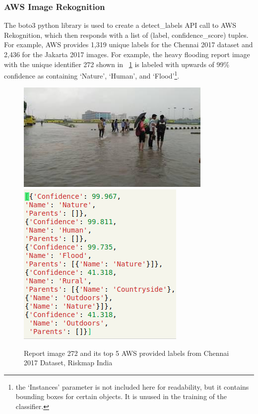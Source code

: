 \subsubsection{AWS Image Rekognition}\label{chap4:aws}
The boto3 python library is used to create a detect\_labels API call 
to AWS Rekognition, which then responds with a list of (label,
confidence\_score) tuples. For example, AWS provides 1,319 unique labels for the
Chennai 2017 dataset and 2,436 for the Jakarta 2017 images. For example, the
heavy flooding report image with the unique identifier 272 shown in
\figureautorefname{}~\ref{fig:aws_272} is labeled with upwards of 99\% confidence as containing `Nature', `Human', and `Flood'\footnote{the `Instances' parameter is
not included here for readability, but it contains bounding boxes for certain
objects. It is unused in the training of the classifier.}.
\begin{figure}[ht]
    \centering
    \captionsetup{justification=centering}
    \includegraphics[scale=0.6]{images/ch/272.jpeg}
    \includegraphics[scale=0.6]{images/ch/aws_272.png}
    \caption{Report image 272 and its top 5 AWS provided labels from Chennai
    2017 Dataset, Riskmap India}\label{fig:aws_272}
\end{figure}

